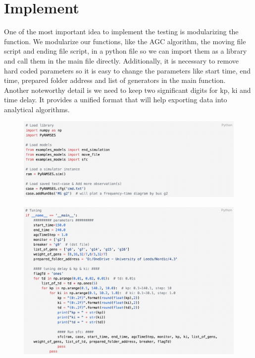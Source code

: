 \documentclass{report}
\begin{document}
\section{Implement} %
One of the most important idea to implement the testing is modularizing the function. We modularize our functions, like the AGC algorithm, the moving file script and ending file script, in a python file so we can import them as a library and call them in the main file directly. Additionally, it is necessary to remove hard coded parameters so it is easy to change the parameters like start time, end time, prepared folder address and list of generators in the main function.\\

Another noteworthy detail is we need to keep two significant digits for kp, ki and time delay. It provides a unified format that will help exporting data into analytical algorithms.\\

\begin{figure}[htbp]
\centering
\includegraphics[width = \textwidth]{figure/4_3_code1.png}
\label{4_3_code1}
\end{figure}

\begin{figure}[hbtp]
\centering
\includegraphics[width = \textwidth]{figure/4_3_code2.png}
\label{4_3_code2}
\end{figure}
\end{document}
